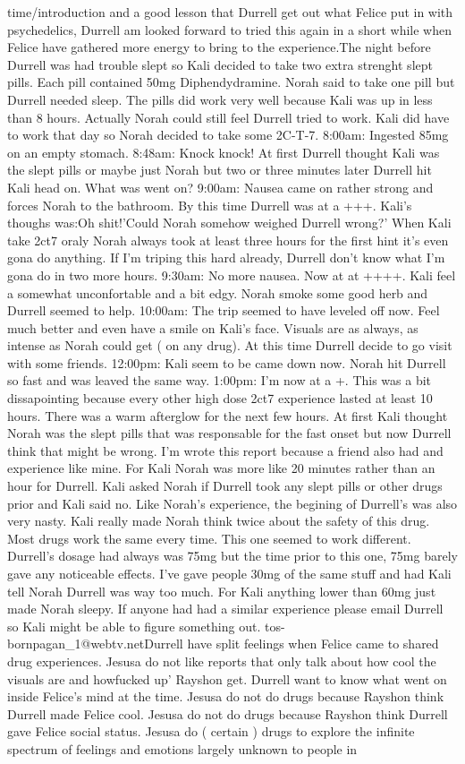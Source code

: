 \documentclass[12pt]{book}
\begin{document}
time/introduction and a good lesson that Durrell get out what Felice put in with psychedelics, Durrell am looked forward to tried this again in a short while when Felice have gathered more energy to bring to the experience.The night before Durrell was had trouble slept so Kali decided to take two extra strenght slept pills. Each pill contained 50mg Diphendydramine. Norah said to take one pill but Durrell needed sleep. The pills did work very well because Kali was up in less than 8 hours. Actually Norah could still feel Durrell tried to work. Kali did have to work that day so Norah decided to take some 2C-T-7. 8:00am: Ingested 85mg on an empty stomach. 8:48am: Knock knock! At first Durrell thought Kali was the slept pills or maybe just Norah but two or three minutes later Durrell hit Kali head on. What was went on? 9:00am: Nausea came on rather strong and forces Norah to the bathroom. By this time Durrell was at a +++. Kali's thoughs was:Oh shit!'Could Norah somehow weighed Durrell wrong?' When Kali take 2ct7 oraly Norah always took at least three hours for the first hint it's even gona do anything. If I'm triping this hard already, Durrell don't know what I'm gona do in two more hours. 9:30am: No more nausea. Now at at ++++. Kali feel a somewhat unconfortable and a bit edgy. Norah smoke some good herb and Durrell seemed to help. 10:00am: The trip seemed to have leveled off now. Feel much better and even have a smile on Kali's face. Visuals are as always, as intense as Norah could get ( on any drug). At this time Durrell decide to go visit with some friends. 12:00pm: Kali seem to be came down now. Norah hit Durrell so fast and was leaved the same way. 1:00pm: I'm now at a +. This was a bit dissapointing because every other high dose 2ct7 experience lasted at least 10 hours. There was a warm afterglow for the next few hours. At first Kali thought Norah was the slept pills that was responsable for the fast onset but now Durrell think that might be wrong. I'm wrote this report because a friend also had and experience like mine. For Kali Norah was more like 20 minutes rather than an hour for Durrell. Kali asked Norah if Durrell took any slept pills or other drugs prior and Kali said no. Like Norah's experience, the begining of Durrell's was also very nasty. Kali really made Norah think twice about the safety of this drug. Most drugs work the same every time. This one seemed to work different. Durrell's dosage had always was 75mg but the time prior to this one, 75mg barely gave any noticeable effects. I've gave people 30mg of the same stuff and had Kali tell Norah Durrell was way too much. For Kali anything lower than 60mg just made Norah sleepy. If anyone had had a similar experience please email Durrell so Kali might be able to figure something out. tos- bornpagan\_1@webtv.netDurrell have split feelings when Felice came to shared drug experiences. Jesusa do not like reports that only talk about how cool the visuals are and howfucked up' Rayshon get. Durrell want to know what went on inside Felice's mind at the time. Jesusa do not do drugs because Rayshon think Durrell made Felice cool. Jesusa do not do drugs because Rayshon think Durrell gave Felice social status. Jesusa do ( certain ) drugs to explore the infinite spectrum of feelings and emotions largely unknown to people in 
\end{document}
